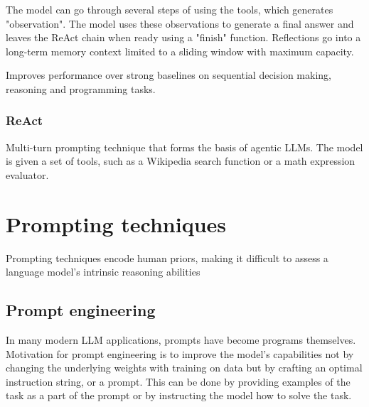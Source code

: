 The model can go through several steps of using the tools, which generates "observation". The model uses these observations to generate a final answer and leaves the ReAct chain when ready using a "finish" function.
Reflections go into a long-term memory context limited to a sliding window with maximum capacity. \cite{shinn2023reflexionlanguageagentsverbal}

Improves performance over strong baselines on sequential decision making, reasoning and programming tasks. \cite{shinn2023reflexionlanguageagentsverbal}
\subsubsection{ReAct}
Multi-turn prompting technique that forms the basis of agentic LLMs. The model is given a set of tools, such as a Wikipedia search function or a math expression evaluator.


\section{Prompting techniques}

Prompting techniques encode human priors, making it difficult to assess a language model's intrinsic reasoning abilities \cite{wang2024chainofthoughtreasoningprompting}

\subsection{Prompt engineering}
In many modern LLM applications, prompts have become programs themselves. \cite{schnabel2024symbolicpromptprogramsearch}
Motivation for prompt engineering is to improve the model's capabilities not by changing the underlying weights with training on data but by crafting an optimal instruction string, or a prompt.
This can be done by providing examples of the task as a part of the prompt or by instructing the model how to solve the task.

